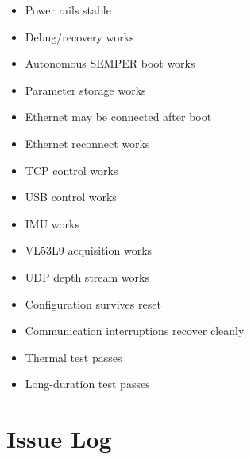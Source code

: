 \documentclass[10pt,a4paper,oneside]{report}
\providecommand{\tightlist}{\setlength{\itemsep}{1pt}\setlength{\parskip}{1pt}}
\begin{document}
\begin{itemize}
\tightlist
\item[$\square$]
  Power rails stable
\item[$\square$]
  Debug/recovery works
\item[$\square$]
  Autonomous SEMPER boot works
\item[$\square$]
  Parameter storage works
\item[$\square$]
  Ethernet may be connected after boot
\item[$\square$]
  Ethernet reconnect works
\item[$\square$]
  TCP control works
\item[$\square$]
  USB control works
\item[$\square$]
  IMU works
\item[$\square$]
  VL53L9 acquisition works
\item[$\square$]
  UDP depth stream works
\item[$\square$]
  Configuration survives reset
\item[$\square$]
  Communication interruptions recover cleanly
\item[$\square$]
  Thermal test passes
\item[$\square$]
  Long-duration test passes
\end{itemize}

\section{Issue Log}\label{wiki-hardware-bring-up-and-testing--25-issue-log}
\end{document}

